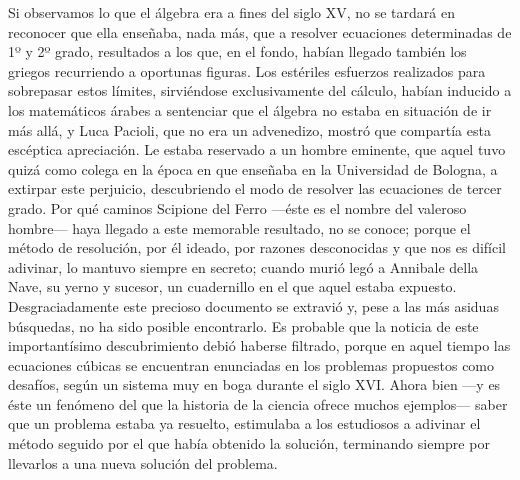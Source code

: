 \documentclass[a4paper, 12pt, draft]{article}
\begin{document}
{%

Si observamos lo que el álgebra era a fines del siglo XV, no se tardará en reconocer que ella enseñaba, nada más, que a resolver ecuaciones determinadas de 1º y 2º grado, resultados a los que, en el fondo, habían llegado también los griegos recurriendo a oportunas figuras. Los estériles esfuerzos realizados para sobrepasar estos límites, sirviéndose exclusivamente del cálculo, habían inducido a los
matemáticos árabes a sentenciar que el álgebra no estaba en situación de ir más allá, y Luca Pacioli, que no era un advenedizo, mostró que compartía esta escéptica apreciación. Le estaba reservado a un hombre eminente, que aquel tuvo quizá como colega en la época en que enseñaba en la Universidad de Bologna, a extirpar este perjuicio, descubriendo el modo de resolver las ecuaciones de tercer grado. Por qué caminos Scipione del Ferro ---éste es el nombre del valeroso hombre--- haya llegado a este memorable resultado, no se conoce; porque el método de resolución, por él ideado, por razones desconocidas y que nos es difícil adivinar, lo mantuvo siempre en secreto; cuando murió legó a Annibale della Nave, su yerno y sucesor, un cuadernillo en el que aquel estaba expuesto. Desgraciadamente este precioso documento se extravió y, pese a las más asiduas búsquedas, no ha sido posible encontrarlo.
Es probable que la noticia de este importantísimo descubrimiento debió haberse filtrado, porque en aquel tiempo las ecuaciones cúbicas se encuentran enunciadas en los problemas propuestos como desafíos, según un sistema muy en boga durante el siglo XVI. Ahora bien ---y es éste un fenómeno del que la historia de la ciencia ofrece muchos ejemplos--- saber que un problema estaba ya resuelto, estimulaba a los estudiosos a adivinar el método seguido por el que había obtenido la solución, terminando siempre por llevarlos a una nueva solución del problema.

}
\end{document}
